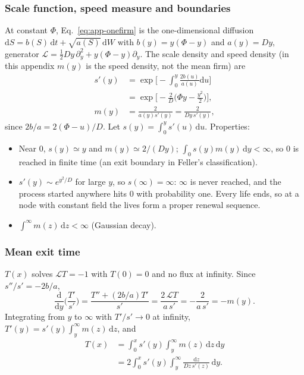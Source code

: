 \documentclass[pre,twocolumn,superscriptaddress,nofootinbib]{revtex4-2}
\newcommand{\dd}{\mathrm d}
\begin{document}
\subsubsection{Scale function, speed measure and boundaries}

At constant $\Phi$, Eq.~\eqref{eq:app-onefirm} is the one-dimensional diffusion
$\dd S=b(S)\,\dd t+\sqrt{a(S)}\,\dd W$ with $b(y)=y(\Phi-y)$ and $a(y)=Dy$, generator
$\mathcal L=\tfrac12Dy\,\partial_y^2+y(\Phi-y)\partial_y$.  The scale density and speed density
\cite{karlintaylor1981} (in this appendix $m(y)$ is the speed density, not the mean firm) are
\begin{equation}
\begin{split}
s'(y)&=\exp\Big[-\int_0^y\frac{2b(u)}{a(u)}\dd u\Big]\\
&=\exp\Big[-\frac2D\Big(\Phi y-\frac{y^2}2\Big)\Big],\\
m(y)&=\frac{2}{a(y)s'(y)}=\frac{2}{Dy\,s'(y)},
\end{split}
\end{equation}
since $2b/a=2(\Phi-u)/D$.  Let $s(y)=\int_0^ys'(u)\,\dd u$.  Properties:
\begin{itemize}
\item Near $0$, $s(y)\simeq y$ and $m(y)\simeq2/(Dy)$; $\int_0s(y)m(y)\,\dd y<\infty$, so $0$ is reached in finite time
  (an exit boundary in Feller's classification).
\item $s'(y)\sim e^{y^2/D}$ for large $y$, so $s(\infty)=\infty$: $\infty$ is never reached, and the process started anywhere
  hits $0$ with probability one.  Every life ends, so at a node with constant field the lives form a proper
  renewal sequence.
\item $\int^\infty m(z)\,\dd z<\infty$ (Gaussian decay).
\end{itemize}


\subsubsection{Mean exit time}

$T(x)$ solves $\mathcal LT=-1$ with $T(0)=0$ and no flux at infinity.  Since $s''/s'=-2b/a$,
\begin{equation}
\frac{\dd}{\dd y}\Big(\frac{T'}{s'}\Big)=\frac{T''+(2b/a)T'}{s'}=\frac{2\,\mathcal LT}{a\,s'}=-\frac{2}{a\,s'}=-m(y).
\end{equation}
Integrating from $y$ to $\infty$ with $T'/s'\to0$ at infinity, $T'(y)=s'(y)\int_y^\infty m(z)\,\dd z$, and
\begin{equation}
\begin{split}
T(x)&=\int_0^xs'(y)\int_y^\infty m(z)\,\dd z\,\dd y\\
&=2\int_0^xs'(y)\int_y^\infty\frac{\dd z}{Dz\,s'(z)}\,\dd y .
\end{split}
\label{eq:app-T}
\end{equation}
\end{document}
